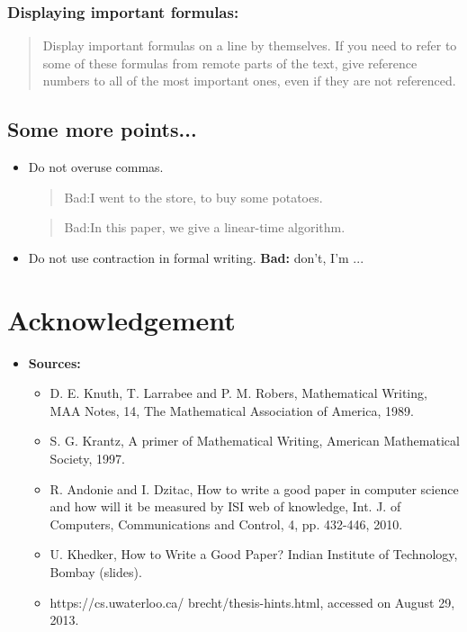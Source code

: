 \documentclass[]{report}
\begin{document}
\subsection{Displaying important formulas:}
\begin{verse}
Display important formulas on a line by themselves. If you
need to refer to some of these formulas from remote parts
of the text, give reference numbers to all of the most
important ones, even if they are not referenced.
\end{verse}
\section{Some more points...}
\begin{itemize}
\item Do not overuse commas.
\begin{verse}
{\large Bad:}I went to the store, to buy some potatoes.
\end{verse}
\begin{verse}
{\large Bad:}In this paper, we give a linear-time algorithm.
\end{verse}
\item Do not use contraction in formal writing. \textbf{Bad:} don't, I'm ...
\end{itemize}

\chapter{Acknowledgement}
\begin{itemize}
\item \textbf{Sources:}
\begin{itemize}
\item D. E. Knuth, T. Larrabee and P. M. Robers, Mathematical
Writing, MAA Notes, 14, The Mathematical Association of
America, 1989.
\item S. G. Krantz, A primer of Mathematical Writing, American
Mathematical Society, 1997.
\item R. Andonie and I. Dzitac, How to write a good paper in
computer science and how will it be measured by ISI web of
knowledge, Int. J. of Computers, Communications and
Control, 4, pp. 432-446, 2010.
\item U. Khedker, How to Write a Good Paper? Indian Institute of
Technology, Bombay (slides).
\item https://cs.uwaterloo.ca/ brecht/thesis-hints.html, accessed
on August 29, 2013.
\end{itemize}
\end{itemize}
\end{document}

